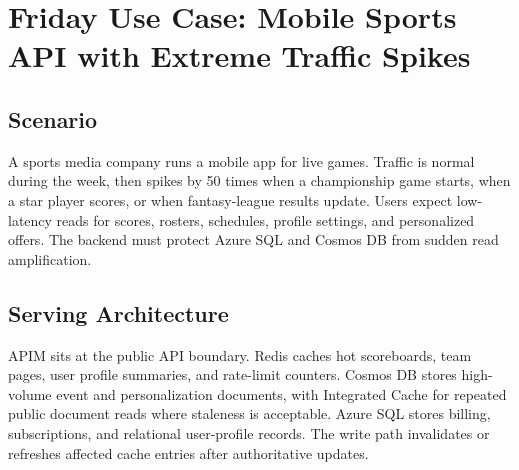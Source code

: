\section{Friday Use Case: Mobile Sports API with Extreme Traffic Spikes}

\subsection{Scenario}
A sports media company runs a mobile app for live games. Traffic is normal during the week, then spikes by 50 times when a championship game starts, when a star player scores, or when fantasy-league results update. Users expect low-latency reads for scores, rosters, schedules, profile settings, and personalized offers. The backend must protect Azure SQL and Cosmos DB from sudden read amplification.

\subsection{Serving Architecture}
APIM sits at the public API boundary. Redis caches hot scoreboards, team pages, user profile summaries, and rate-limit counters. Cosmos DB stores high-volume event and personalization documents, with Integrated Cache for repeated public document reads where staleness is acceptable. Azure SQL stores billing, subscriptions, and relational user-profile records. The write path invalidates or refreshes affected cache entries after authoritative updates.

